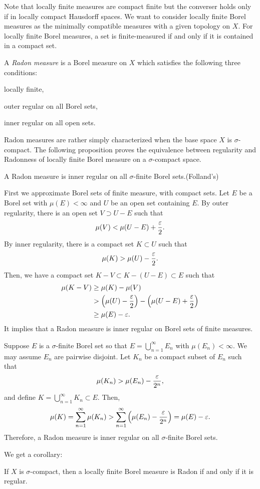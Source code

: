 \documentclass{../note}
\begin{document}
Note that locally finite measures are compact finite but the converser holds only if in locally compact Hausdorff spaces.
We want to consider locally finite Borel measures as the minimally compatible measures with a given topology on $X$.
For locally finite Borel measures, a set is finite-measured if and only if it is contained in a compact set.
\begin{defn}
A \emph{Radon measure} is a Borel measure on $X$ which satisfies the following three conditions:
\begin{parts}
\item locally finite,
\item outer regular on all Borel sets,
\item inner regular on all open sets.
\end{parts}
\end{defn}

Radon measures are rather simply characterized when the base space $X$ is $\sigma$-compact.
The following proposition proves the equivalence between regularity and Radonness of locally finite Borel measure on a $\sigma$-compact space.
\begin{prop}
A Radon measure is inner regular on all $\sigma$-finite Borel sets.(Folland's)
\end{prop}
\begin{pf}
First we approximate Borel sets of finite measure, with compact sets.
Let $E$ be a Borel set with $\mu(E)<\infty$ and $U$ be an open set containing $E$.
By outer regularity, there is an open set $V\supset U-E$ such that
\[\mu(V)<\mu(U-E)+\frac{\varepsilon}2.\]
By inner regularity, there is a compact set $K\subset U$ such that
\[\mu(K)>\mu(U)-\frac{\varepsilon}2.\]
Then, we have a compact set $K-V\subset K-(U-E)\subset E$ such that
\begin{align*}
\mu(K-V)&\ge\mu(K)-\mu(V)\\
&>\left(\mu(U)-\frac{\varepsilon}2\right)-\left(\mu(U-E)+\frac{\varepsilon}2\right)\\
&\ge\mu(E)-\varepsilon.
\end{align*}
It implies that a Radon measure is inner regular on Borel sets of finite measures.

Suppose $E$ is a $\sigma$-finite Borel set so that $E=\bigcup_{n=1}^\infty E_n$ with $\mu(E_n)<\infty$.
We may assume $E_n$ are pairwise disjoint.
Let $K_n$ be a compact subset of $E_n$ such that
\[\mu(K_n)>\mu(E_n)-\frac{\varepsilon}{2^n},\]
and define $K=\bigcup_{n=1}^\infty K_n\subset E$.
Then,
\[\mu(K)=\sum_{n=1}^\infty\mu(K_n)>\sum_{n=1}^\infty\left(\mu(E_n)-\frac{\varepsilon}{2^n}\right)=\mu(E)-\varepsilon.\]
Therefore, a Radon measure is inner regular on all $\sigma$-finite Borel sets.
\end{pf}
We get a corollary:
\begin{cor}
If $X$ is $\sigma$-compact, then a locally finite Borel measure is Radon if and only if it is regular.
\end{cor}
\end{document}
